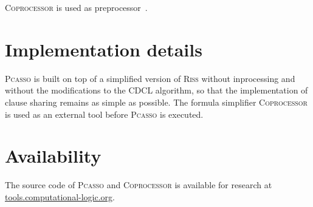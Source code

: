 \documentclass[conference]{IEEEtran}
\newcommand{\1}{x_1}
\newcommand{\2}{x_2}
\newcommand{\3}{x_3}
\newcommand{\4}{x_4}
\newcommand{\5}{x_5}
\newcommand{\6}{x_6}
\newcommand{\7}{x_7}
\newcommand{\8}{x_8}
\newcommand{\9}{x_9}
\newcommand{\pcasso}{\textsc{Pcasso}\xspace}
\newcommand{\coprocessor}{\textsc{Coprocessor}\xspace}
\newcommand{\riss}{\textsc{Riss}\xspace}
\begin{document}
\textsc{Coprocessor} is used as preprocessor~\cite{Manthey:2012:CFC:2352219.2352264}. 


\section{Implementation details}

\pcasso is built on top of a simplified version of \riss without inprocessing and without the modifications to the CDCL algorithm, so that the implementation of clause sharing remains as simple as possible. 
The formula simplifier \textsc{Coprocessor} is used as an external tool before \pcasso is executed. 
 
% 

\section{Availability}

The source code of \pcasso and \coprocessor is available for research at \url{tools.computational-logic.org}. 






% 
\end{document}

